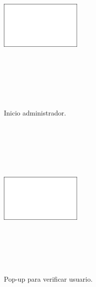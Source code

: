 \documentclass[a4paper, 12pt]{article}
\begin{document}
\begin{figure}[H]
   	\begin{minipage}{0.48\textwidth}
		\begin{center}
			{\includegraphics[height=8cm, width=4cm]{White.png}\par}
			\caption{Inicio administrador.}
			\medskip
		\end{center}  
	\end{minipage}\hfill
   	\begin{minipage}{0.48\textwidth}
		\begin{center}
			{\includegraphics[height=8cm, width=4cm]{White.png}\par}
			\caption{Pop-up para verificar usuario.}
			\medskip
		\end{center}  
	\end{minipage}\hfill
\end{figure}
\end{document}
